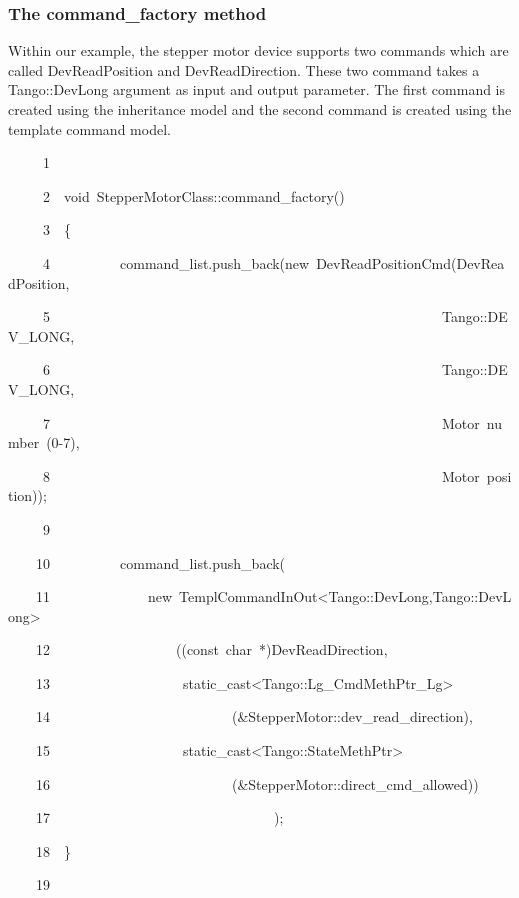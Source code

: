 \subsubsection{The command\_factory method}

Within our example, the stepper motor device supports two commands
which are called DevReadPosition and DevReadDirection. These two command
takes a Tango::DevLong argument as input and output parameter. The
first command is created using the inheritance
model and the second command is created using the template
command model.


\begin{lyxcode}
~~~~~1~~

~~~~~2~~void~StepperMotorClass::command\_factory()

~~~~~3~~\{

~~~~~4~~~~~~~~~~command\_list.push\_back(new~DevReadPositionCmd(\textquotedbl{}DevReadPosition\textquotedbl{},

~~~~~5~~~~~~~~~~~~~~~~~~~~~~~~~~~~~~~~~~~~~~~~~~~~~~~~~~~~~~~~Tango::DEV\_LONG,

~~~~~6~~~~~~~~~~~~~~~~~~~~~~~~~~~~~~~~~~~~~~~~~~~~~~~~~~~~~~~~Tango::DEV\_LONG,

~~~~~7~~~~~~~~~~~~~~~~~~~~~~~~~~~~~~~~~~~~~~~~~~~~~~~~~~~~~~~~\textquotedbl{}Motor~number~(0-7)\textquotedbl{},

~~~~~8~~~~~~~~~~~~~~~~~~~~~~~~~~~~~~~~~~~~~~~~~~~~~~~~~~~~~~~~\textquotedbl{}Motor~position\textquotedbl{}));

~~~~~9~~~~~~~~~~~~~~~~~~~~~~~~~~~~~~~~~~~~~~~~~~~~~~~~~~~~~~~~

~~~~10~~~~~~~~~~command\_list.push\_back(

~~~~11~~~~~~~~~~~~~~new~TemplCommandInOut<Tango::DevLong,Tango::DevLong>

~~~~12~~~~~~~~~~~~~~~~~~((const~char~{*})\textquotedbl{}DevReadDirection\textquotedbl{},

~~~~13~~~~~~~~~~~~~~~~~~~static\_cast<Tango::Lg\_CmdMethPtr\_Lg>

~~~~14~~~~~~~~~~~~~~~~~~~~~~~~~~(\&StepperMotor::dev\_read\_direction),

~~~~15~~~~~~~~~~~~~~~~~~~static\_cast<Tango::StateMethPtr>

~~~~16~~~~~~~~~~~~~~~~~~~~~~~~~~(\&StepperMotor::direct\_cmd\_allowed))

~~~~17~~~~~~~~~~~~~~~~~~~~~~~~~~~~~~~~);

~~~~18~~\}

~~~~19~~
\end{lyxcode}


